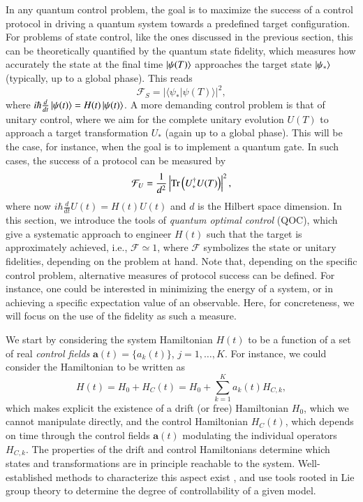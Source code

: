 In any quantum control problem, the goal is to maximize the success of a control protocol in driving a quantum system towards a predefined target configuration. For problems of state control, like the ones discussed in the previous section, this can be theoretically quantified by the quantum state fidelity, which measures how accurately the state at the final time $\ket{\psi(T)}$ approaches the target state $\ket{\psi_\ast}$ (typically, up to a global phase). This reads
\begin{equation}
    \mathcal{F}_S = \lvert \langle \psi_\ast |\psi(T)\rangle|^2,
\end{equation}
where $i\hbar \frac{d}{dt}\ket{\psi(t)}=H(t)\ket{\psi(t)}$. A more demanding control problem is that of unitary control, where we aim for the complete unitary evolution $U(T)$ to approach a target transformation $U_\ast$ (again up to a global phase). This will be the case, for instance, when the goal is to implement a quantum gate.  In such cases, the success of a protocol can be measured by 
\begin{equation}
    \mathcal{F}_U = \frac{1}{d^2}\left\lvert \Tr\left(U_\ast^\dagger U(T)\right)\right\rvert^2,
\end{equation}
 where now $i\hbar \frac{d}{dt}U(t)=H(t)U(t)$ and $d$ is the Hilbert space dimension. In this section, we introduce the tools of \textit{quantum optimal control} (QOC), which give a systematic approach to engineer $H(t)$ such that the target is approximately achieved, i.e., $\mathcal{F}\simeq 1$, where $\mathcal{F}$ symbolizes the state or unitary fidelities, depending on the problem at hand. Note that, depending on the specific control problem, alternative measures of protocol success can be defined. For instance, one could be interested in minimizing the energy of a system, or in achieving a specific expectation value of an observable. Here, for concreteness, we will focus on the use of the fidelity as such a measure.

We start by considering the system Hamiltonian $H(t)$ to be a function of a set of real \textit{control fields} $\bm{a}(t)=\{a_k(t)\}$, $j=1,\ldots,K$. For instance, we could consider the Hamiltonian to be written as
\begin{equation}
    H(t) = H_0 + H_C(t) = H_0 + \sum\limits_{k=1}^K a_k(t) H_{C,k},
    \label{eq:QOC_hami}
\end{equation}
which makes explicit the existence of a drift (or free) Hamiltonian $H_0$, which we cannot manipulate directly, and the control Hamiltonian $H_C(t)$, which depends on time through the control fields $\bm{a}(t)$ modulating the individual operators $H_{C,k}$. The properties of the drift and control Hamiltonians determine which states and transformations are in principle reachable to the system. Well-established methods to characterize this aspect exist \cite{dalessandro_book,poggi2019geometric}, and use tools rooted in Lie group theory to determine the degree of controllability of a given model.

